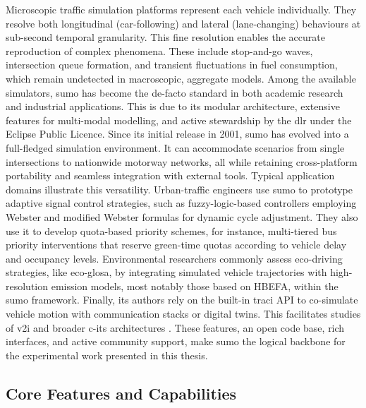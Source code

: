 Microscopic traffic simulation platforms represent each vehicle individually. They resolve both longitudinal (car-following) and lateral (lane-changing) behaviours at sub-second temporal granularity. This fine resolution enables the accurate reproduction of complex phenomena. These include stop-and-go waves, intersection queue formation, and transient fluctuations in fuel consumption, which remain undetected in macroscopic, aggregate models. \cite{Koutsopoulos2005Microsim} Among the available simulators, \ac{sumo} has become the de-facto standard in both academic research and industrial applications. This is due to its modular architecture, extensive features for multi-modal modelling, and active stewardship by the \ac{dlr} under the Eclipse Public Licence. Since its initial release in 2001, \ac{sumo} has evolved into a full-fledged simulation environment. It can accommodate scenarios from single intersections to nationwide motorway networks, all while retaining cross-platform portability and seamless integration with external tools.
\mynewline
Typical application domains illustrate this versatility. Urban-traffic engineers use \ac{sumo} to prototype adaptive signal control strategies, such as fuzzy-logic-based controllers employing Webster and modified Webster formulas for dynamic cycle adjustment. \cite{Ali2021AdaptiveFuzzyWebster} They also use it to develop quota-based priority schemes, for instance, multi-tiered bus priority interventions that reserve green-time quotas according to vehicle delay and occupancy levels. \cite{Schmidt2024BusPriority} Environmental researchers commonly assess eco-driving strategies, like \ac{eco-glosa}, by integrating simulated vehicle trajectories with high-resolution emission models, most notably those based on HBEFA, within the \ac{sumo} framework. \cite{jayawardana2022learning, varga2024systematic} Finally, \ac{its} authors rely on the built-in \ac{traci} API to co-simulate vehicle motion with communication stacks or digital twins. This facilitates studies of \ac{v2i} and broader \ac{c-its} architectures \cite{Sommer2008TraCI}. These features, an open code base, rich interfaces, and active community support, make \ac{sumo} the logical backbone for the experimental work presented in this thesis.


\subsection{Core Features and Capabilities}
\label{subsec:sumo_core_features}

